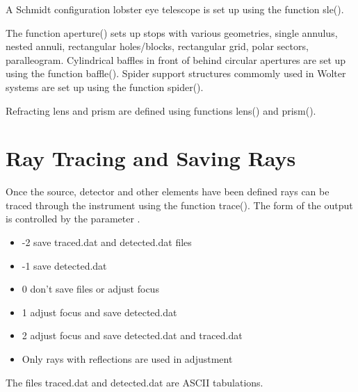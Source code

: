 \documentclass[letterpaper,10pt,english]{sphinxmanual}
\begin{document}
A Schmidt configuration lobster eye telescope is set up using the
function sle().


The function aperture() sets up stops with various geometries, single
annulus, nested annuli, rectangular holes/blocks, rectangular grid,
polar sectors, paralleogram. Cylindrical baffles in front of behind
circular apertures are set up using the function baffle(). Spider
support structures commomly used in Wolter systems are set up using
the function spider().


Refracting lens and prism are defined using functions lens() and prism().


\section{Ray Tracing and Saving Rays}
\label{\detokenize{xsrt_tracing:ray-tracing-and-saving-rays}}\label{\detokenize{xsrt_tracing::doc}}
Once the source, detector and other elements have been defined rays can be
traced through the instrument using the function trace(). The form of the
output is controlled by the parameter .
\begin{itemize}
\item {} 
-2 save traced.dat and detected.dat files

\item {} 
-1 save detected.dat

\item {} 
0 don’t save files or adjust focus

\item {} 
1 adjust focus and save detected.dat

\item {} 
2 adjust focus and save detected.dat and traced.dat

\item {} 
Only rays with  reflections are used in adjustment

\end{itemize}

The files traced.dat and detected.dat are ASCII tabulations.
\end{document}
